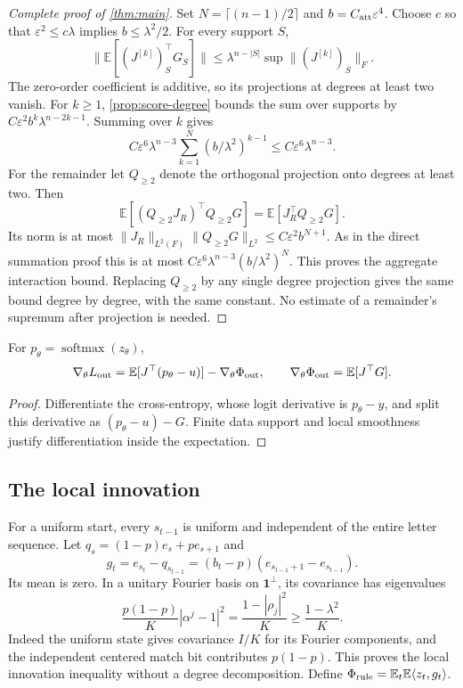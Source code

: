 \begin{proof}[Complete proof of \cref{thm:main}]
Set $N=\lceil(n-1)/2\rceil$ and $b=C_{\rm att}\varepsilon^4$. Choose $c$ so that $\varepsilon^2\le c\lambda$ implies $b\le\lambda^2/2$. For every support $S$,
\[
 \|\mathbb E[(J^{[k]})_S^\top G_S]\|
 \le\lambda^{n-|S|}\sup\|(J^{[k]})_S\|_F.
\]
The zero-order coefficient is additive, so its projections at degrees at least two vanish. For $k\ge1$, \cref{prop:score-degree} bounds the sum over supports by $C\varepsilon^2b^k\lambda^{n-2k-1}$. Summing over $k$ gives
\[
 C\varepsilon^6\lambda^{n-3}\sum_{k=1}^N(b/\lambda^2)^{k-1}
 \le C\varepsilon^6\lambda^{n-3}.
\]
For the remainder let $Q_{\ge2}$ denote the orthogonal projection onto degrees at least two. Then
\[
 \mathbb E[(Q_{\ge2}J_R)^\top Q_{\ge2}G]
 =\mathbb E[J_R^\top Q_{\ge2}G].
\]
Its norm is at most $\|J_R\|_{L^2(F)}\|Q_{\ge2}G\|_{L^2}\le C\varepsilon^2b^{N+1}$. As in the direct summation proof this is at most $C\varepsilon^6\lambda^{n-3}(b/\lambda^2)^N$. This proves the aggregate interaction bound. Replacing $Q_{\ge2}$ by any single degree projection gives the same bound degree by degree, with the same constant. No estimate of a remainder's supremum after projection is needed.
\end{proof}

\begin{lemma}\label{lem:gradient-split}
For $p_\theta=\operatorname{softmax}(z_\theta)$,
\[
 \nabla_\theta L_{\rm out}=\mathbb E[J^\top(p_\theta-u)]-\nabla_\theta\Phi_{\mathrm{out}},
 \qquad \nabla_\theta\Phi_{\mathrm{out}}=\mathbb E[J^\top G].
\]
\end{lemma}
\begin{proof}
Differentiate the cross-entropy, whose logit derivative is $p_\theta-y$, and split this derivative as $(p_\theta-u)-G$. Finite data support and local smoothness justify differentiation inside the expectation.
\end{proof}

\subsection{The local innovation}
For a uniform start, every $s_{t-1}$ is uniform and independent of the entire letter sequence. Let $q_s=(1-p)e_s+pe_{s+1}$ and
\[
 g_t=e_{s_t}-q_{s_{t-1}}=(b_t-p)(e_{s_{t-1}+1}-e_{s_{t-1}}).
\]
Its mean is zero. In a unitary Fourier basis on $\bm1^\perp$, its covariance has eigenvalues
\[
 \frac{p(1-p)}K|\alpha^j-1|^2
 =\frac{1-|\rho_j|^2}K\ge\frac{1-\lambda^2}K.
\]
Indeed the uniform state gives covariance $I/K$ for its Fourier components, and the independent centered match bit contributes $p(1-p)$. This proves the local innovation inequality without a degree decomposition. Define $\Phi_{\mathrm{rule}}=\mathbb E_t\mathbb E\langle z_t,g_t\rangle$.

